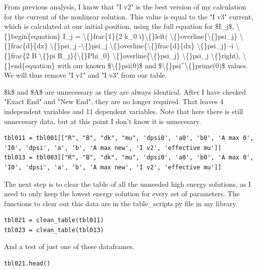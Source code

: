 \documentclass{article}
\begin{document}
From previous analysis, I know that "I v2" is the best version of my calculation for the current of the nonlinear solution. This value is equal to the "I v3" current, which is calculated at our initial position, using the full equation for \$I\_j\$,
\textbackslash\{\}begin\{equation\}
I\_j = \textbackslash\{\}frac\{1\}\{2 k\_0 i\}\textbackslash\{\}left( \textbackslash\{\}overline\{\textbackslash\{\}psi\_j\} \textbackslash\{\}frac\{d\}\{dx\} \textbackslash\{\}psi\_j -\textbackslash\{\}psi\_j \textbackslash\{\}overline\{\textbackslash\{\}frac\{d\}\{dx\} \textbackslash\{\}psi\_j\} -i \textbackslash\{\}frac\{2 B \textbackslash\{\}pi R\_j\}\{\textbackslash\{\}Phi\_0\} \textbackslash\{\}overline\{\textbackslash\{\}psi\_j\}  \textbackslash\{\}psi\_j  \textbackslash\{\}right),
\textbackslash\{\}end\{equation\}
with our known \$\textbackslash\{\}psi(0)\$ and \$\textbackslash\{\}psi\textasciicircum{}\textbackslash\{\}prime(0)\$ values. We will thus remove "I v1" and "I v3" from our table. 

\$k\$ and \$A\$ are unnecessary as they are always identical. After I have checked "Exact End" and "New End", they are no longer required. That leaves 4 independent variables and 11 dependent variables. Note that here there is still unnecesary data, but at this point I don't know it is unnecesary.

\begin{lstlisting}
tbl011 = tbl001[["R", "B", "dk", "mu", 'dpsi0', 'a0', 'b0', 'A max 0', 'I0', 'dpsi', 'a', 'b', 'A max new', 'I v2', 'effective mu']]
tbl013 = tbl003[["R", "B", "dk", "mu", 'dpsi0', 'a0', 'b0', 'A max 0', 'I0', 'dpsi', 'a', 'b', 'A max new', 'I v2', 'effective mu']]\end{lstlisting}

The next step is to clear the table of all the unneeded high energy solutions, as I need to only keep the lowest energy solution for every set of parameters. The functions to clear out this data are in the table\_scripts.py file in my library.

\begin{lstlisting}
tbl021 = clean_table(tbl011)
tbl023 = clean_table(tbl013)\end{lstlisting}

And a test of just one of these dataframes.

\begin{lstlisting}
tbl021.head()\end{lstlisting}
\end{document}
